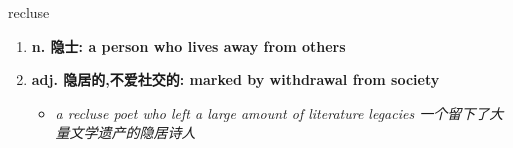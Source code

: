 
\begin{frame}
{\huge recluse}
\begin{center}
\begin{enumerate}\Large
  \item \textbf{n. 隐士: a person who lives away from others}
  \item \textbf{adj. 隐居的,不爱社交的: marked by withdrawal from society}
  \begin{itemize}
    \item \em{\Large{a recluse poet who left a large amount of literature legacies 一个留下了大量文学遗产的隐居诗人}}
  \end{itemize}
\end{enumerate}
\end{center}
\end{frame}

